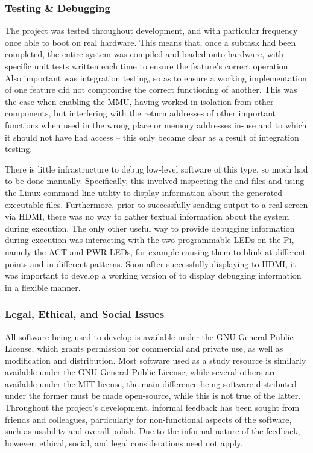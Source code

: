     \subsubsection{Testing \& Debugging}
        The project was tested throughout development, and with particular
        frequency once able to boot on real hardware. This means that, once a
        subtask had been completed, the entire system was compiled and loaded
        onto hardware, with specific unit tests written each time to ensure the
        feature's correct operation. Also important was integration testing, so
        as to ensure a working implementation of one feature did not compromise
        the correct functioning of another. This was the case when enabling the
        MMU, having worked in isolation from other components, but interfering
        with the return addresses of other important functions when used in the
        wrong place or memory addresses in-use and to which it should not have
        had access -- this only became clear as a result of integration testing.

        There is little infrastructure to debug low-level software of this type,
        so much had to be done manually. Specifically, this involved inspecting
        the  and  files and using the Linux command-line
        utility  \cite{nm} to display information about the generated
        executable files. Furthermore, prior to successfully sending output to a
        real screen via HDMI, there was no way to gather textual information
        about the system during execution. The only other useful way to provide
        debugging information during execution was interacting with the two
        programmable LEDs on the Pi, namely the ACT and PWR LEDs, for example
        causing them to blink at different points and in different patterns.
        Soon after successfully displaying to HDMI, it was important to develop
        a working version of  to display debugging information in a
        flexible manner.

    \subsubsection{Legal, Ethical, and Social Issues}
        All software being used to develop is available under the GNU General
        Public License, which grants permission for commercial and private use,
        as well as modification and distribution. Most software used as a study
        resource is similarly available under the GNU General Public License,
        while several others are available under the MIT license, the main
        difference being software distributed under the former must be made
        open-source, while this is not true of the latter. Throughout the
        project's development, informal feedback has been sought from friends
        and colleagues, particularly for non-functional aspects of the software,
        such as usability and overall polish. Due to the informal nature of the
        feedback, however, ethical, social, and legal considerations need not
        apply.
